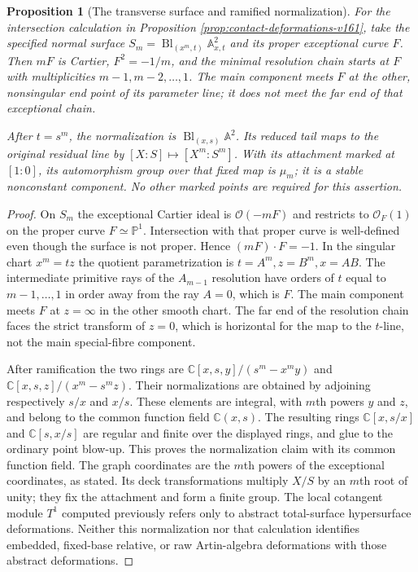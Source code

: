 \documentclass[11pt,reqno]{amsart}
\numberwithin{equation}{section}
\newtheorem{proposition}[theorem]{Proposition}
\theoremstyle{definition}\newtheorem{definition}[theorem]{Definition}
\theoremstyle{remark}\newtheorem{remark}[theorem]{Remark}
\newcommand{\C}{\mathbb C}\newcommand{\Q}{\mathbb Q}
\newcommand{\Pj}{\mathbb P}\newcommand{\A}{\mathbb A}
\newcommand{\OO}{\mathcal O}\newcommand{\II}{\mathcal I}
\begin{document}
\begin{proposition}[The transverse surface and ramified normalization]
\label{prop:transverse-details-v162}
For the intersection calculation in Proposition
\ref{prop:contact-deformations-v161}, take the specified normal surface
$S_m=\operatorname{Bl}_{(x^m,t)}\A^2_{x,t}$ and its proper exceptional
curve $F$. Then $mF$ is Cartier, $F^2=-1/m$, and the minimal
resolution chain starts at $F$ with multiplicities
$m-1,m-2,\ldots,1$. The main component meets $F$ at the other,
nonsingular end point of its parameter line; it does not meet the
far end of that exceptional chain.

After $t=s^m$, the normalization is
$\operatorname{Bl}_{(x,s)}\A^2$. Its reduced tail maps to the original
residual line by $[X:S]\mapsto[X^m:S^m]$. With its attachment marked
at $[1:0]$, its automorphism group over that fixed map is $\mu_m$;
it is a stable nonconstant component. No other marked points are
required for this assertion.
\end{proposition}
\begin{proof}
On $S_m$ the exceptional Cartier ideal is $\OO(-mF)$ and restricts
to $\OO_F(1)$ on the proper curve $F\simeq\Pj^1$. Intersection
with that proper curve is well-defined even though the surface is
not proper. Hence $(mF)\cdot F=-1$. In the singular chart
$x^m=tz$ the quotient parametrization is
$t=A^m,z=B^m,x=AB$. The intermediate primitive rays of the
$A_{m-1}$ resolution have orders of $t$ equal to
$m-1,\ldots,1$ in order away from the ray $A=0$, which is $F$.
The main component meets $F$ at $z=\infty$ in the other smooth chart.
The far end of the resolution chain faces the strict transform of
$z=0$, which is horizontal for the map to the $t$-line, not the
main special-fibre component.

After ramification the two rings are
$\C[x,s,y]/(s^m-x^my)$ and
$\C[x,s,z]/(x^m-s^mz)$. Their normalizations are obtained by
adjoining respectively $s/x$ and $x/s$. These elements are integral,
with $m$th powers $y$ and $z$, and belong to the common function
field $\C(x,s)$. The resulting rings $\C[x,s/x]$ and
$\C[s,x/s]$ are regular and finite over the displayed rings,
and glue to the ordinary point blow-up. This proves the normalization
claim with its common function field. The graph coordinates are the
$m$th powers of the exceptional coordinates, as stated. Its deck
transformations multiply $X/S$ by an $m$th root of unity; they fix
the attachment and form a finite group. The local cotangent module
$T^1$ computed previously refers only to abstract total-surface
hypersurface deformations. Neither this normalization nor that
calculation identifies embedded, fixed-base relative, or raw
Artin-algebra deformations with those abstract deformations.
\end{proof}
\end{document}
